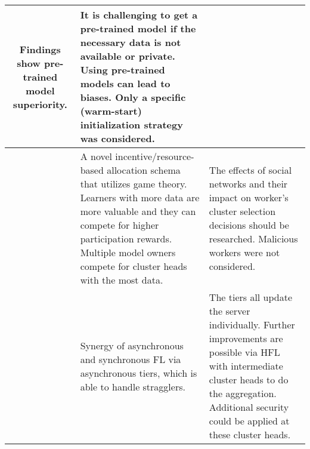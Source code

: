 \begin{changemargin}{-2cm}{0cm}
\begin{tabular}{|c||m{0.4\paperwidth}|m{0.4\paperwidth}|}
            Findings show pre-trained model superiority.
            &
            It is challenging to get a pre-trained model if the necessary data is not available or private.
            Using pre-trained models can lead to biases.
            Only a specific (warm-start) initialization strategy was considered.
        \\
        \hline
            \cite{paper:decentralized_edge_intelligence_dynamic_resource_allocation_framework_hfl}
            &
            A novel incentive/resource-based allocation schema that utilizes game theory.
            Learners with more data are more valuable and they can compete for higher participation rewards.
            Multiple model owners compete for cluster heads with the most data.
            &
            The effects of social networks and their impact on worker's cluster selection decisions should be researched.
            Malicious workers were not considered.
        \\
        \hline
            \cite{paper:fedat_high_performance_communication_efficient_fl_with_asynch_tiers}
            &
            Synergy of asynchronous and synchronous FL via asynchronous tiers, which is able to handle stragglers.
            &
            The tiers all update the server individually.
            Further improvements are possible via HFL with intermediate cluster heads to do the aggregation.
            Additional security could be applied at these cluster heads.
        \\
        \hline
    \end{tabular}
    \label{table:fl_research_table_1}
\end{changemargin}
